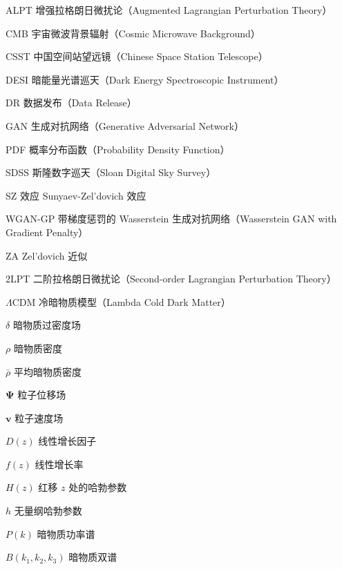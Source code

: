 
\begin{denotation}[3cm]
  \item[ALPT] 增强拉格朗日微扰论（Augmented Lagrangian Perturbation Theory）
  \item[CMB] 宇宙微波背景辐射（Cosmic Microwave Background）
  \item[CSST] 中国空间站望远镜（Chinese Space Station Telescope）
  \item[DESI] 暗能量光谱巡天（Dark Energy Spectroscopic Instrument）
  \item[DR] 数据发布（Data Release）
  \item[GAN] 生成对抗网络（Generative Adversarial Network）
  \item[PDF] 概率分布函数（Probability Density Function）
  \item[SDSS] 斯隆数字巡天（Sloan Digital Sky Survey） 
  \item[SZ 效应] Sunyaev-Zel'dovich 效应
  \item[WGAN-GP] 带梯度惩罚的 Wasserstein 生成对抗网络（Wasserstein GAN with Gradient Penalty）
  \item[ZA] Zel'dovich 近似
  \item[2LPT] 二阶拉格朗日微扰论（Second-order Lagrangian Perturbation Theory）
  \item[$\Lambda$CDM] 冷暗物质模型（Lambda Cold Dark Matter）
  \item[$\delta$] 暗物质过密度场
  \item[$\rho$] 暗物质密度
  \item[$\bar{\rho}$] 平均暗物质密度
  \item[$\boldsymbol{\Psi}$] 粒子位移场
  \item[$\boldsymbol{v}$] 粒子速度场
  \item[$D(z)$] 线性增长因子
  \item[$f(z)$] 线性增长率
  \item[$H(z)$] 红移 $z$ 处的哈勃参数
  \item[$h$] 无量纲哈勃参数
  \item[$P(k)$] 暗物质功率谱
  \item[$B(k_1,k_2,k_3)$] 暗物质双谱
\end{denotation}
